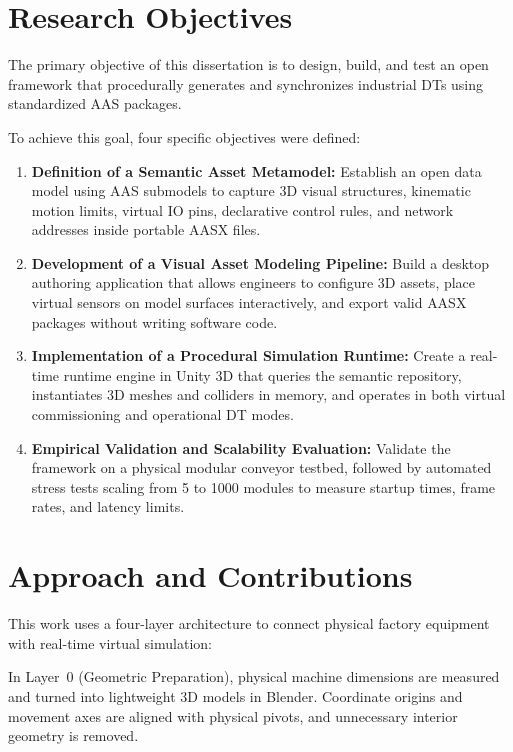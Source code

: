 \section{Research Objectives}
\label{sec:objectives}

The primary objective of this dissertation is to design, build, and test an open framework that procedurally generates and synchronizes industrial \glspl{DT} using standardized \gls{AAS} packages.

To achieve this goal, four specific objectives were defined:

\begin{enumerate}
    \item \textbf{Definition of a Semantic Asset Metamodel:} Establish an open data model using \gls{AAS} submodels to capture 3D visual structures, kinematic motion limits, virtual \gls{IO} pins, declarative control rules, and network addresses inside portable \gls{AASX} files.

    \item \textbf{Development of a Visual Asset Modeling Pipeline:} Build a desktop authoring application that allows engineers to configure 3D assets, place virtual sensors on model surfaces interactively, and export valid \gls{AASX} packages without writing software code.

    \item \textbf{Implementation of a Procedural Simulation Runtime:} Create a real-time runtime engine in Unity 3D that queries the semantic repository, instantiates 3D meshes and colliders in memory, and operates in both virtual commissioning and operational \gls{DT} modes.

    \item \textbf{Empirical Validation and Scalability Evaluation:} Validate the framework on a physical modular conveyor testbed, followed by automated stress tests scaling from 5 to 1000 modules to measure startup times, frame rates, and latency limits.
\end{enumerate}

\section{Approach and Contributions}
\label{sec:approach}

This work uses a four-layer architecture to connect physical factory equipment with real-time virtual simulation:

In Layer~0 (Geometric Preparation), physical machine dimensions are measured and turned into lightweight 3D models in Blender. Coordinate origins and movement axes are aligned with physical pivots, and unnecessary interior geometry is removed.

